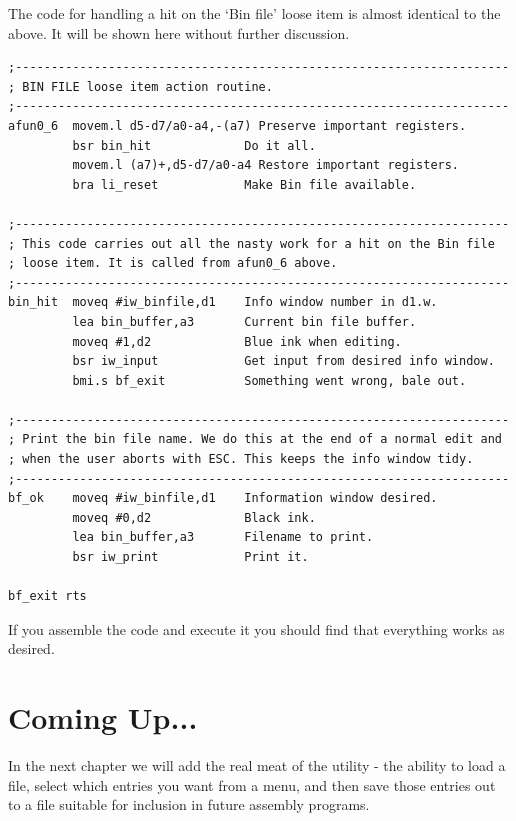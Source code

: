 The code for handling a hit on the `Bin file' loose item is almost
    identical to the above. It will be shown here without further
    discussion.

\begin{lstlisting}[firstnumber=1,]
;---------------------------------------------------------------------
; BIN FILE loose item action routine.
;---------------------------------------------------------------------
afun0_6  movem.l d5-d7/a0-a4,-(a7) Preserve important registers.
         bsr bin_hit             Do it all.
         movem.l (a7)+,d5-d7/a0-a4 Restore important registers.
         bra li_reset            Make Bin file available.

;---------------------------------------------------------------------
; This code carries out all the nasty work for a hit on the Bin file
; loose item. It is called from afun0_6 above.
;---------------------------------------------------------------------
bin_hit  moveq #iw_binfile,d1    Info window number in d1.w.
         lea bin_buffer,a3       Current bin file buffer.
         moveq #1,d2             Blue ink when editing.
         bsr iw_input            Get input from desired info window.
         bmi.s bf_exit           Something went wrong, bale out.

;---------------------------------------------------------------------
; Print the bin file name. We do this at the end of a normal edit and
; when the user aborts with ESC. This keeps the info window tidy.
;---------------------------------------------------------------------
bf_ok    moveq #iw_binfile,d1    Information window desired.
         moveq #0,d2             Black ink.
         lea bin_buffer,a3       Filename to print.
         bsr iw_print            Print it.
         
bf_exit rts 
\end{lstlisting}

If you assemble the code and execute it you should find that
    everything works as desired.

\section{Coming Up...}
\label{ch32-the-end}%

In the next chapter we will add the real meat of
    the utility -{} the ability to load a file, select which entries you want
    from a menu, and then save those entries out to a file suitable for
    inclusion in future assembly programs.
